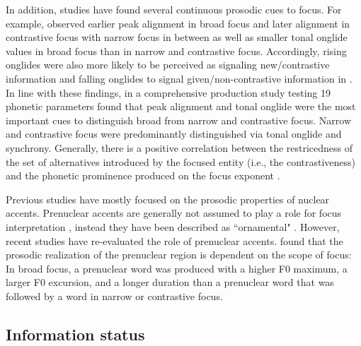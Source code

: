 In addition, studies have found several continuous prosodic cues to focus. For example, \citet{griceIntegratingDiscretenessContinuity2017} observed earlier peak alignment in broad focus and later alignment in contrastive focus with narrow focus in between as well as smaller tonal onglide values in broad focus than in narrow and contrastive focus. Accordingly, rising onglides were also more likely to be perceived as signaling new/contrastive information and falling onglides to signal given/non-con\-tras\-tive information in \citet{ritterRoleTonalOnglides2015}. In line with these findings, \citet{roessigTracingPhoneticSpace2022} in a comprehensive production study testing 19 phonetic parameters found that peak alignment and tonal onglide were the most important cues to distinguish broad from narrow and contrastive focus. Narrow and contrastive focus were predominantly distinguished via tonal onglide and synchrony. Generally, there is a positive correlation between the restricedness of the set of alternatives introduced by the focused entity (i.e., the contrastiveness) and the phonetic prominence produced on the focus exponent \citep[19]{calhounCentralityMetricalStructure2010}. 

Previous studies have mostly focused on the prosodic properties of nuclear accents. Prenuclear accents are generally not assumed to play a role for focus interpretation \citep[266]{laddIntonationalPhonology2008}, instead they have been described as ``ornamental" \citep[454]{buringSemanticsIntonationInformation2007}. However, recent studies have re-evaluated the role of prenuclear accents. \citet{roessigInverseRelationPrenuclear2024} found that the prosodic realization of the prenuclear region is dependent on the scope of focus: In broad focus, a prenuclear word was produced with a higher F0 maximum, a larger F0 excursion, and a longer duration than a prenuclear word that was followed by a word in narrow or contrastive focus. 

\subsection{Information status}

